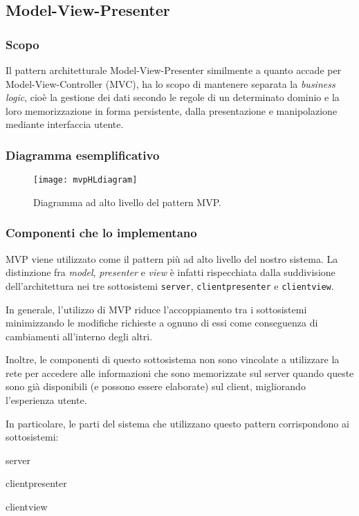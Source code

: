 \subsection{Model-View-Presenter}
\subsubsection{Scopo}
Il pattern architetturale \foreignlanguage{english}{Model-View-Presenter} similmente a quanto accade per \foreignlanguage{english}{Model-View-Controller} (MVC), ha lo scopo di mantenere separata la \textit{business logic}, cioè la gestione dei dati secondo le regole di un determinato dominio e la loro memorizzazione in forma persistente, dalla presentazione e manipolazione mediante interfaccia utente.
\subsubsection{Diagramma esemplificativo}
\begin{figure}[h]
\centering
\texttt{[image: mvpHLdiagram]}
\caption{Diagramma ad alto livello del pattern MVP.}\label{fig:mvpHL}
\end{figure}

\subsubsection{Componenti che lo implementano}
MVP viene utilizzato come il pattern più ad alto livello del nostro sistema. La distinzione fra \textit{model}, \textit{presenter} e \textit{view} è infatti rispecchiata dalla suddivisione dell'architettura nei tre sottosistemi \texttt{server}, \texttt{clientpresenter} e \texttt{clientview}.

In generale, l'utilizzo di MVP riduce l'accoppiamento tra i sottosistemi minimizzando le modifiche richieste a ognuno di essi come conseguenza di cambiamenti all'interno degli altri.

Inoltre, le componenti di questo sottosistema non sono vincolate a utilizzare la rete per accedere alle informazioni che sono memorizzate sul server quando queste sono già disponibili (e possono essere elaborate) sul client, migliorando l'esperienza utente.

In particolare, le parti del sistema che utilizzano questo pattern corrispondono ai sottosistemi:
\begin{description}
  \item{\ttfamily server}
  \item{\ttfamily clientpresenter}
  \item{\ttfamily clientview} 
\end{description}

